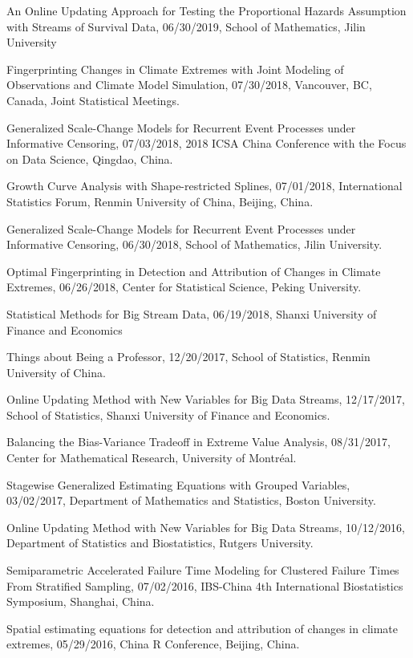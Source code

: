 \documentclass[Statistics]{vita}
\begin{document}
\begin{vita}
\begin{InvitedTalks}
  \item An Online Updating Approach for Testing the Proportional Hazards Assumption with Streams of Survival Data, 06/30/2019, School of Mathematics, Jilin University
  \item Fingerprinting Changes in Climate Extremes with Joint Modeling of Observations and Climate Model Simulation, 07/30/2018, Vancouver, BC, Canada, Joint Statistical Meetings.
  \item Generalized Scale-Change Models for Recurrent Event Processes under Informative Censoring, 07/03/2018, 2018 ICSA China Conference with the Focus on Data Science, Qingdao, China.
  \item Growth Curve Analysis with Shape-restricted Splines, 07/01/2018, International Statistics Forum, Renmin University of China, Beijing, China.
  \item Generalized Scale-Change Models for Recurrent Event Processes under Informative Censoring, 06/30/2018, School of Mathematics, Jilin University.
  \item Optimal Fingerprinting in Detection and Attribution of Changes in Climate Extremes, 06/26/2018, Center for Statistical Science, Peking University.
  \item Statistical Methods for Big Stream Data, 06/19/2018, Shanxi University of Finance and Economics
  \item Things about Being a Professor, 12/20/2017, School of Statistics, Renmin University of China.
  \item Online Updating Method with New Variables for Big Data Streams, 12/17/2017, School of Statistics, Shanxi University of Finance and Economics.
  \item Balancing the Bias-Variance Tradeoff in Extreme Value Analysis, 08/31/2017, Center for Mathematical Research, University of Montr\'eal.
  \item Stagewise Generalized Estimating Equations with Grouped Variables, 03/02/2017, Department of Mathematics and Statistics, Boston University.
  \item Online Updating Method with New Variables for Big Data Streams, 10/12/2016, Department of Statistics and Biostatistics, Rutgers University.
  \item Semiparametric Accelerated Failure Time Modeling for Clustered Failure Times From Stratified Sampling, 07/02/2016, IBS-China 4th International Biostatistics Symposium, Shanghai, China.
  \item Spatial estimating equations for detection and attribution of changes in climate extremes, 05/29/2016, China R Conference, Beijing, China.

\end{InvitedTalks}
\end{vita}
\end{document}
